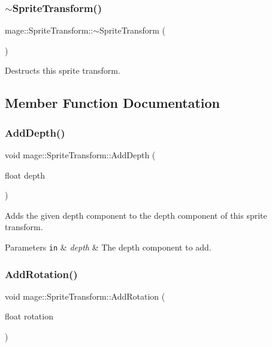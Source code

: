 \subsubsection{\texorpdfstring{$\sim$\+Sprite\+Transform()}{~SpriteTransform()}}
{\footnotesize\ttfamily mage\+::\+Sprite\+Transform\+::$\sim$\+Sprite\+Transform (\begin{DoxyParamCaption}{ }\end{DoxyParamCaption})\hspace{0.3cm}{\ttfamily [default]}}

Destructs this sprite transform. 

\subsection{Member Function Documentation}
\hypertarget{structmage_1_1_sprite_transform_a9865d77d9c2e02758b1466423c12bcc2}{}\label{structmage_1_1_sprite_transform_a9865d77d9c2e02758b1466423c12bcc2} 
\subsubsection{\texorpdfstring{Add\+Depth()}{AddDepth()}}
{\footnotesize\ttfamily void mage\+::\+Sprite\+Transform\+::\+Add\+Depth (\begin{DoxyParamCaption}\item[{float}]{depth }\end{DoxyParamCaption})}

Adds the given depth component to the depth component of this sprite transform.


\begin{DoxyParams}[1]{Parameters}
\mbox{\tt in}  & {\em depth} & The depth component to add. \\
\hline
\end{DoxyParams}
\hypertarget{structmage_1_1_sprite_transform_a0a24823966ff906791ae598ac4248d03}{}\label{structmage_1_1_sprite_transform_a0a24823966ff906791ae598ac4248d03} 
\subsubsection{\texorpdfstring{Add\+Rotation()}{AddRotation()}}
{\footnotesize\ttfamily void mage\+::\+Sprite\+Transform\+::\+Add\+Rotation (\begin{DoxyParamCaption}\item[{float}]{rotation }\end{DoxyParamCaption})}

